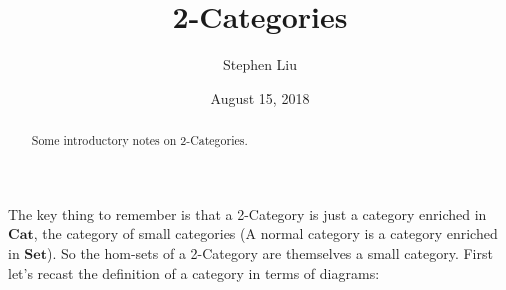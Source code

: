 \documentclass[11pt]{article}
\theoremstyle{definition}
\theoremstyle{definition}
\theoremstyle{plain}
\theoremstyle{plain}
\theoremstyle{plain}
\begin{document}
\author{Stephen Liu}
\title{2-Categories}
\date{August 15, 2018}

\maketitle

\begin{abstract}
Some introductory notes on 2-Categories.
\end{abstract}

The key thing to remember is that a 2-Category is just a category enriched in $\textbf{Cat}$, the category of small categories (A normal category is a category enriched in $\textbf{Set}$). So the hom-sets of a 2-Category are themselves a small category. First let's recast the definition of a category in terms of diagrams:
\end{document}
